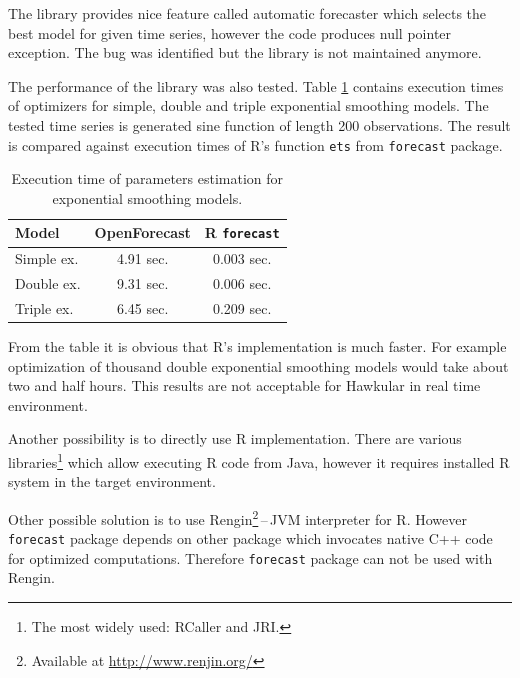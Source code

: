     The library provides nice feature called automatic forecaster which selects the best model for given
    time series, however the code produces null pointer exception. The bug was identified but the library is not
    maintained anymore.

    The performance of the library was also tested. Table \ref{tab:open-forecast-perf} contains execution times of
    optimizers for simple, double and triple exponential smoothing models. The tested time series is generated sine
    function of length 200 observations. The result is compared against execution times of R's function \texttt{ets}
    from \texttt{forecast} package.

    \begin{table}[h]
        \begin{center}
            \begin{tabular}{l|c|c}
                \textbf{Model} & \textbf{OpenForecast} & \textbf{R \texttt{forecast}} \\ \hline \hline
                Simple ex. & 4.91 sec. & 0.003 sec.\\
                Double ex. & 9.31 sec. & 0.006 sec.\\
                Triple ex. & 6.45 sec. & 0.209 sec.\\
            \end{tabular}
            \caption{Execution time of parameters estimation for exponential smoothing models.}
            \label{tab:open-forecast-perf}
        \end{center}
    \end{table}

    From the table it is obvious that R's implementation is much faster. For example optimization of thousand double
    exponential smoothing models would take about two and half hours. This results are not acceptable for Hawkular in
    real time environment.

    Another possibility is to directly use R implementation. There are various libraries\footnote{The most widely used:
    RCaller and JRI.} which allow executing R code from Java, however it requires installed R system in the target
    environment.

    Other possible solution is to use Rengin\footnote{Available at \url{http://www.renjin.org/}}\,--\,JVM interpreter
    for R. However \texttt{forecast} package depends on other package which invocates native C++ code for optimized
    computations. Therefore \texttt{forecast} package can not be used with Rengin.

